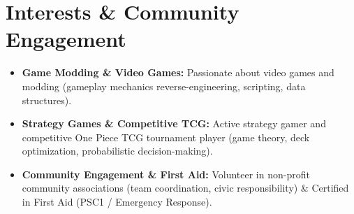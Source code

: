 \documentclass[10pt,a4paper]{article}
\begin{document}
\section{Interests \& Community Engagement}
\begin{itemize}
    \item \textbf{Game Modding \& Video Games:} Passionate about video games and modding (gameplay mechanics reverse-engineering, scripting, data structures).
    \item \textbf{Strategy Games \& Competitive TCG:} Active strategy gamer and competitive One Piece TCG tournament player (game theory, deck optimization, probabilistic decision-making).
    \item \textbf{Community Engagement \& First Aid:} Volunteer in non-profit community associations (team coordination, civic responsibility) \& Certified in First Aid (PSC1 / Emergency Response).
\end{itemize}
\end{document}

